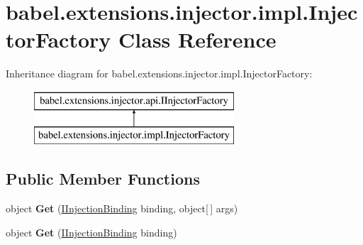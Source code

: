 \hypertarget{classbabel_1_1extensions_1_1injector_1_1impl_1_1_injector_factory}{\section{babel.\-extensions.\-injector.\-impl.\-Injector\-Factory Class Reference}
\label{classbabel_1_1extensions_1_1injector_1_1impl_1_1_injector_factory}
}
Inheritance diagram for babel.\-extensions.\-injector.\-impl.\-Injector\-Factory\-:\begin{figure}[H]
\begin{center}
\leavevmode
\includegraphics[height=2.000000cm]{classbabel_1_1extensions_1_1injector_1_1impl_1_1_injector_factory}
\end{center}
\end{figure}
\subsection*{Public Member Functions}
\begin{DoxyCompactItemize}
\item 
\hypertarget{classbabel_1_1extensions_1_1injector_1_1impl_1_1_injector_factory_a149af4ca7e59dbdfa20ae7b1361ccc4e}{object {\bfseries Get} (\hyperlink{interfacebabel_1_1extensions_1_1injector_1_1api_1_1_i_injection_binding}{I\-Injection\-Binding} binding, object\mbox{[}$\,$\mbox{]} args)}\label{classbabel_1_1extensions_1_1injector_1_1impl_1_1_injector_factory_a149af4ca7e59dbdfa20ae7b1361ccc4e}

\item 
\hypertarget{classbabel_1_1extensions_1_1injector_1_1impl_1_1_injector_factory_ad73843f74d5fa99ea377fc0803e2181e}{object {\bfseries Get} (\hyperlink{interfacebabel_1_1extensions_1_1injector_1_1api_1_1_i_injection_binding}{I\-Injection\-Binding} binding)}\label{classbabel_1_1extensions_1_1injector_1_1impl_1_1_injector_factory_ad73843f74d5fa99ea377fc0803e2181e}

\end{DoxyCompactItemize}
